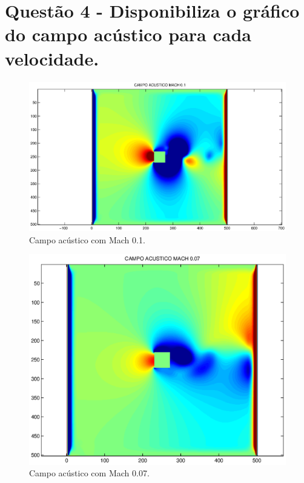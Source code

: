 \section{Questão 4 - Disponibiliza o gráfico do campo acústico para cada velocidade.}
\newpage
\begin{figure}[h!]
    \centering
    \hspace{-3.cm}
    \includegraphics[width=1.2\textwidth]{Mach_0.1/campo_pressao.eps}
    \caption{Campo acústico com Mach 0.1.}
\end{figure}

\begin{figure}[h!]
    \centering
    \hspace{-3.cm}
    \includegraphics[width=1.2\textwidth]{Mach_0.07/campo_pressao.eps}
    \caption{Campo acústico com Mach 0.07.}
\end{figure}

